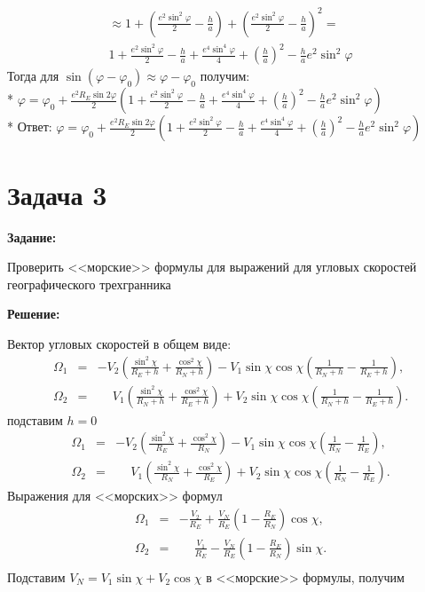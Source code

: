 \documentclass[a4paper,14pt]{article}
\theoremstyle{plain} %
\theoremstyle{definition} %
\theoremstyle{remark} %
\begin{document}
{\begin{align*}
    \approx1+(\frac{e^2\sin^2\varphi}{2}-\frac{h}{a})+(\frac{e^2\sin^2\varphi}{2}-\frac{h}{a})^2=                                             \\
    1+\frac{e^2\sin^2\varphi}{2}-\frac{h}{a}+\frac{e^4\sin^4\varphi}{4}+(\frac{h}{a})^2-\frac{h}{a}e^2\sin^2\varphi
\end{align*}
Тогда для $\sin(\varphi-\varphi_0)\approx\varphi-\varphi_0$ получим:\\*
$\varphi=\varphi_0+\frac{e^2R_E\sin2\varphi}{2}(1+\frac{e^2\sin^2\varphi}{2}-\frac{h}{a}+\frac{e^4\sin^4\varphi}{4}+(\frac{h}{a})^2-\frac{h}{a}e^2\sin^2\varphi)$ \\*
Ответ: $\varphi=\varphi_0+\frac{e^2R_E\sin2\varphi}{2}(1+\frac{e^2\sin^2\varphi}{2}-\frac{h}{a}+\frac{e^4\sin^4\varphi}{4}+(\frac{h}{a})^2-\frac{h}{a}e^2\sin^2\varphi)$


\section{Задача 3}
\textbf{Задание:}

Проверить <<морские>> формулы для выражений для угловых скоростей географического трехгранника

\textbf{Решение:}

Вектор угловых скоростей в общем виде:
\begin{eqnarray*}
    \Omega_{1} &=& - V_{2}\left(\frac{\sin^{2}\chi}{R_{E}+h} +
    \frac{\cos^{2}\chi}{R_{N}+h}\right) - V_{1} \sin \chi \cos \chi
    \left(\frac{1}{R_{N}+h} -
    \frac{1}{R_{E}+h}\right) , \nonumber \\
    \Omega_{2} &=& \phantom{-} V_{1}\left(\frac{\sin^{2}\chi}{R_{N}+h} +
    \frac{\cos^{2}\chi}{R_{E}+h}\right ) + V_{2} \sin \chi \cos \chi
    \left(\frac{1}{R_{N}+h} - \frac{1}{R_{E}+h}\right).
\end{eqnarray*}
подставим $h=0$
\begin{eqnarray*}
    \Omega_{1} &=& - V_{2}\left(\frac{\sin^{2}\chi}{R_{E}} +
    \frac{\cos^{2}\chi}{R_{N}}\right) - V_{1} \sin \chi \cos \chi
    \left(\frac{1}{R_{N}} -
    \frac{1}{R_{E}}\right) , \nonumber \\
    \Omega_{2} &=& \phantom{-} V_{1}\left(\frac{\sin^{2}\chi}{R_{N}} +
    \frac{\cos^{2}\chi}{R_{E}}\right ) + V_{2} \sin \chi \cos \chi
    \left(\frac{1}{R_{N}} - \frac{1}{R_{E}}\right).
\end{eqnarray*}
Выражения для <<морских>> формул
\begin{eqnarray*}
    \Omega_1  &=& - \frac{V_2}{R_E} + \frac{V_N}{R_E} \left( 1 - \frac{R_E}{R_N}\right) \cos \chi, \nonumber \\
    \Omega_2  &=& \phantom{-} \frac{V_1}{R_E} - \frac{V_N}{R_E} \left( 1
    - \frac{R_E}{R_N}\right) \sin \chi. \nonumber \\
\end{eqnarray*}
Подставим $V_N=V_1 \sin \chi + V_2 \cos \chi$ в <<морские>> формулы, получим

}
\end{document}
